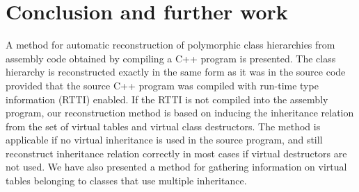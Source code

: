 \documentclass[times, 10pt,twocolumn]{article}
\begin{document}
\section{Conclusion and further work}


A method for automatic reconstruction of polymorphic class hierarchies
from assembly code obtained by compiling a C++ program is presented.
The class hierarchy is reconstructed exactly in the same form as it
was in the source code provided that the source C++ program
was compiled with run-time type information (RTTI) enabled.
%
If the RTTI is not compiled into the assembly program, our reconstruction
method is based on inducing the inheritance relation
from the set of virtual tables and virtual class destructors.
The method is applicable if no virtual inheritance is used in the source
program, and still reconstruct inheritance relation correctly in most cases
if virtual destructors are not used.
We have also presented a method for gathering information
on virtual tables belonging to classes that use multiple inheritance.
\end{document}
